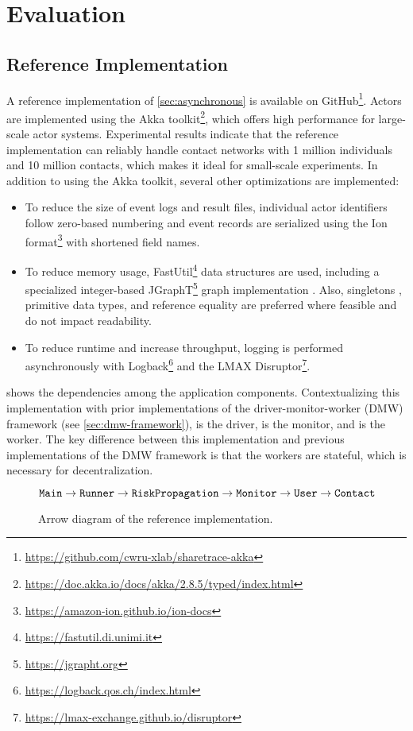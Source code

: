 \chapter{Evaluation}

\section{Reference Implementation}

A reference implementation of \cref{sec:asynchronous} is available on GitHub\footnote{\url{https://github.com/cwru-xlab/sharetrace-akka}}. Actors are implemented using the Akka toolkit\footnote{\url{https://doc.akka.io/docs/akka/2.8.5/typed/index.html}}, which offers high performance for large-scale actor systems. Experimental results indicate that the reference implementation can reliably handle contact networks with 1 million individuals and 10 million contacts, which makes it ideal for small-scale experiments. In addition to using the Akka toolkit, several other optimizations are implemented:
\begin{itemize}
  \item To reduce the size of event logs and result files, individual actor identifiers follow zero-based numbering and event records are serialized using the Ion format\footnote{\url{https://amazon-ion.github.io/ion-docs}} with shortened field names.
  \item To reduce memory usage, FastUtil\footnote{\url{https://fastutil.di.unimi.it}} data structures are used, including a specialized integer-based JGraphT\footnote{\url{https://jgrapht.org}} graph implementation \citep{Michail2020}. Also, singletons \citep{Gamma1995}, primitive data types, and reference equality are preferred where feasible and do not impact readability.
  \item To reduce runtime and increase throughput, logging is performed asynchronously with Logback\footnote{\url{https://logback.qos.ch/index.html}} and the LMAX Disruptor\footnote{\url{https://lmax-exchange.github.io/disruptor}}.
\end{itemize}

 shows the dependencies among the application components. Contextualizing this implementation with prior implementations of the driver-monitor-worker (DMW) framework (see \cref{sec:dmw-framework}),  is the driver,  is the monitor, and  is the worker. The key difference between this implementation and previous implementations of the DMW framework is that the workers are stateful, which is necessary for decentralization.
\begin{figure}[htbp]
\begin{equation*}
  \texttt{Main} \rightarrow \texttt{Runner} \rightarrow \texttt{RiskPropagation} \rightarrow \texttt{Monitor} \rightarrow \texttt{User} \rightarrow \texttt{Contact}
\end{equation*}
\caption[Arrow diagram of the reference implementation]{Arrow diagram of the reference implementation.}
\label{fig:arrow-diagram}
\end{figure}

